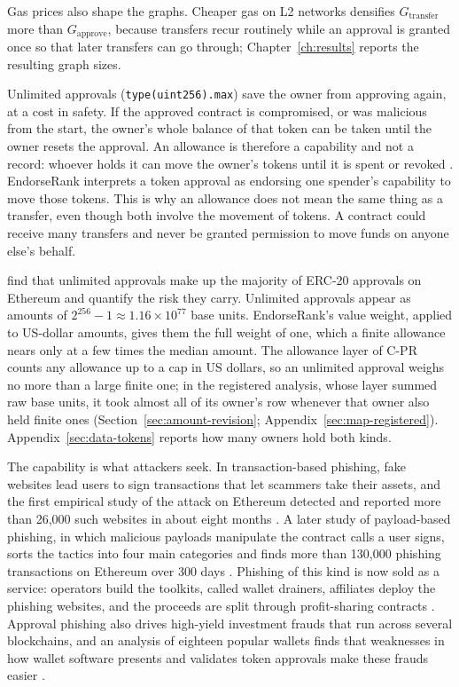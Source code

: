 Gas prices also shape the graphs. Cheaper gas on L2 networks densifies $G_{\text{transfer}}$ more than $G_{\text{approve}}$, because transfers recur routinely while an approval is granted once so that later transfers can go through; Chapter~\ref{ch:results} reports the resulting graph sizes.


Unlimited approvals (\texttt{type(uint256).max}) save the owner from approving again, at a cost in safety. If the approved contract is compromised, or was malicious from the start, the owner's whole balance of that token can be taken until the owner resets the approval. An allowance is therefore a capability and not a record: whoever holds it can move the owner's tokens until it is spent or revoked \parencite{vogelsteller2015erc20}. EndorseRank interprets a token approval as endorsing one spender's capability to move those tokens. This is why an allowance does not mean the same thing as a transfer, even though both involve the movement of tokens. A contract could receive many transfers and never be granted permission to move funds on anyone else's behalf.

\textcite{wang2022unlimited} find that unlimited approvals make up the majority of ERC-20 approvals on Ethereum and quantify the risk they carry. Unlimited approvals appear as amounts of $2^{256}-1\approx1.16\times10^{77}$ base units. EndorseRank's value weight, applied to US-dollar amounts, gives them the full weight of one, which a finite allowance nears only at a few times the median amount. The allowance layer of C-PR counts any allowance up to a cap in US dollars, so an unlimited approval weighs no more than a large finite one; in the registered analysis, whose layer summed raw base units, it took almost all of its owner's row whenever that owner also held finite ones (Section~\ref{sec:amount-revision}; Appendix~\ref{sec:map-registered}). Appendix~\ref{sec:data-tokens} reports how many owners hold both kinds.

The capability is what attackers seek. In transaction-based phishing, fake websites lead users to sign transactions that let scammers take their assets, and the first empirical study of the attack on Ethereum detected and reported more than 26,000 such websites in about eight months \parencite{he2023txphishscope}. A later study of payload-based phishing, in which malicious payloads manipulate the contract calls a user signs, sorts the tactics into four main categories and finds more than 130,000 phishing transactions on Ethereum over 300 days \parencite{chen2025payload}. Phishing of this kind is now sold as a service: operators build the toolkits, called wallet drainers, affiliates deploy the phishing websites, and the proceeds are split through profit-sharing contracts \parencite{he2025drainer}. Approval phishing also drives high-yield investment frauds that run across several blockchains, and an analysis of eighteen popular wallets finds that weaknesses in how wallet software presents and validates token approvals make these frauds easier \parencite{adamczyk2025approval}.

